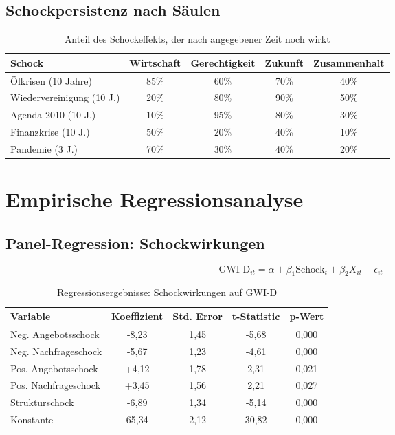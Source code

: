\subsection{Schockpersistenz nach Säulen}

\begin{table}[ht]
\centering
\begin{tabular}{lcccc}
\toprule
\textbf{Schock} & \textbf{Wirtschaft} & \textbf{Gerechtigkeit} & \textbf{Zukunft} & \textbf{Zusammenhalt} \\
\midrule
Ölkrisen (10 Jahre) & 85\% & 60\% & 70\% & 40\% \\
Wiedervereinigung (10 J.) & 20\% & 80\% & 90\% & 50\% \\
Agenda 2010 (10 J.) & 10\% & 95\% & 80\% & 30\% \\
Finanzkrise (10 J.) & 50\% & 20\% & 40\% & 10\% \\
Pandemie (3 J.) & 70\% & 30\% & 40\% & 20\% \\
\bottomrule
\end{tabular}
\caption{Anteil des Schockeffekts, der nach angegebener Zeit noch wirkt}
\label{tab:schock-persistenz}
\end{table}

\section{Empirische Regressionsanalyse}

\subsection{Panel-Regression: Schockwirkungen}

\[
\text{GWI-D}_{it} = \alpha + \beta_1 \text{Schock}_t + \beta_2 X_{it} + \epsilon_{it}
\]

\begin{table}[ht]
\centering
\begin{tabular}{lcccc}
\toprule
\textbf{Variable} & \textbf{Koeffizient} & \textbf{Std. Error} & \textbf{t-Statistic} & \textbf{p-Wert} \\
\midrule
Neg. Angebotsschock & -8,23 & 1,45 & -5,68 & 0,000 \\
Neg. Nachfrageschock & -5,67 & 1,23 & -4,61 & 0,000 \\
Pos. Angebotsschock & +4,12 & 1,78 & 2,31 & 0,021 \\
Pos. Nachfrageschock & +3,45 & 1,56 & 2,21 & 0,027 \\
Strukturschock & -6,89 & 1,34 & -5,14 & 0,000 \\
Konstante & 65,34 & 2,12 & 30,82 & 0,000 \\
\bottomrule
\end{tabular}
\caption{Regressionsergebnisse: Schockwirkungen auf GWI-D}
\label{tab:regression-schocks}
\end{table}

